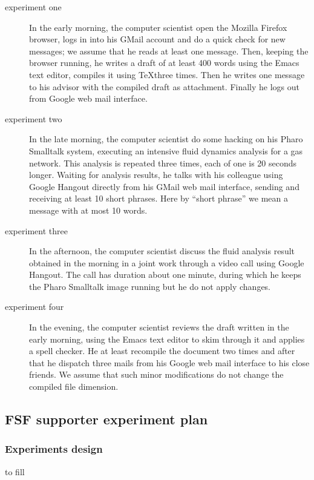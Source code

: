\documentclass[10pt,a4paper]{article}
\begin{document}
    \begin{description}
    \item[experiment one] In the early morning, the computer scientist
      open the Mozilla Firefox browser, logs in into his GMail account
      and do a quick check for new messages; we assume that he reads
      at least one message. Then, keeping the browser running, he
      writes a draft of at least 400 words using the Emacs text
      editor, compiles it using \TeX three times. Then he writes one
      message to his advisor with the compiled draft as
      attachment. Finally he logs out from Google web mail interface.
    \item[experiment two] In the late morning, the computer scientist
      do some hacking on his Pharo Smalltalk system, executing an
      intensive fluid dynamics analysis for a gas network. This
      analysis is repeated three times, each of one is 20 seconds
      longer. Waiting for analysis results, he talks with his
      colleague using Google Hangout directly from his GMail web mail
      interface, sending and receiving at least 10 short phrases. Here
      by ``short phrase'' we mean a message with at most 10 words.
    \item[experiment three] In the afternoon, the computer scientist
      discuss the fluid analysis result obtained in the morning in a
      joint work through a video call using Google Hangout. The call
      has duration about one minute, during which he keeps the Pharo
      Smalltalk image running but he do not apply changes.
    \item[experiment four] In the evening, the computer scientist
      reviews the draft written in the early morning, using the Emacs
      text editor to skim through it and applies a spell checker. He
      at least recompile the document two times and after that he
      dispatch three mails from his Google web mail interface to his
      close friends. We assume that such minor modifications do not
      change the compiled file dimension.
    \end{description}

    \newpage
    \subsection{FSF supporter experiment plan}

    \subsubsection*{Experiments design }
    to fill
\end{document}
